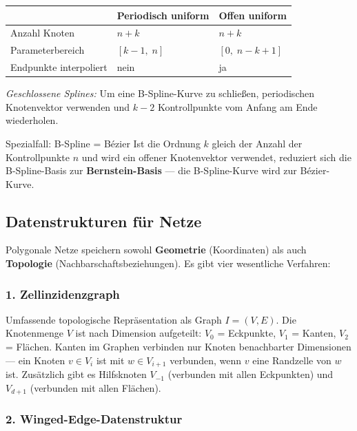 \documentclass[12pt, a4paper]{article}
\begin{document}
\begin{center}
\begin{tabular}{lll}
  & \textbf{Periodisch uniform} & \textbf{Offen uniform} \\
  \hline
  Anzahl Knoten & $n + k$ & $n + k$ \\
  Parameterbereich & $[k-1,\; n]$ & $[0,\; n-k+1]$ \\
  Endpunkte interpoliert & nein & ja \\
\end{tabular}
\end{center}

\textit{Geschlossene Splines:} Um eine B-Spline-Kurve zu schließen, periodischen Knotenvektor verwenden und $k-2$ Kontrollpunkte vom Anfang am Ende wiederholen.

\begin{notebox}{Spezialfall: B-Spline = Bézier}
Ist die Ordnung $k$ gleich der Anzahl der Kontrollpunkte $n$ und wird ein offener Knotenvektor verwendet, reduziert sich die B-Spline-Basis zur \textbf{Bernstein-Basis} — die B-Spline-Kurve wird zur Bézier-Kurve.
\end{notebox}

\subsection{Datenstrukturen für Netze}

Polygonale Netze speichern sowohl \textbf{Geometrie} (Koordinaten) als auch \textbf{Topologie} (Nachbarschaftsbeziehungen). Es gibt vier wesentliche Verfahren:

\subsubsection*{1. Zellinzidenzgraph}

Umfassende topologische Repräsentation als Graph $I = (V, E)$. Die Knotenmenge $V$ ist nach Dimension aufgeteilt: $V_0$ = Eckpunkte, $V_1$ = Kanten, $V_2$ = Flächen. Kanten im Graphen verbinden nur Knoten benachbarter Dimensionen — ein Knoten $v \in V_i$ ist mit $w \in V_{i+1}$ verbunden, wenn $v$ eine Randzelle von $w$ ist. Zusätzlich gibt es Hilfsknoten $V_{-1}$ (verbunden mit allen Eckpunkten) und $V_{d+1}$ (verbunden mit allen Flächen).

\subsubsection*{2. Winged-Edge-Datenstruktur}
\end{document}
